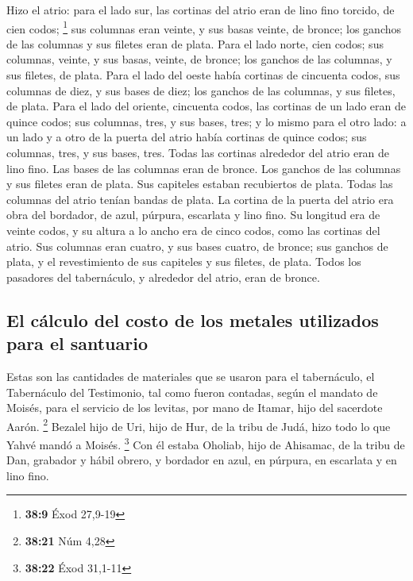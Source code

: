 \begin{paracol}{2}
 Hizo el atrio: para el lado sur, las cortinas del atrio
eran de lino fino torcido, de cien codos; \footnote{\textbf{38:9} Éxod
  27,9-19}  sus columnas eran veinte, y sus basas veinte,
de bronce; los ganchos de las columnas y sus filetes eran de plata.
 Para el lado norte, cien codos; sus columnas, veinte, y
sus basas, veinte, de bronce; los ganchos de las columnas, y sus
filetes, de plata.  Para el lado del oeste había cortinas
de cincuenta codos, sus columnas de diez, y sus bases de diez; los
ganchos de las columnas, y sus filetes, de plata.  Para
el lado del oriente, cincuenta codos,  las cortinas de un
lado eran de quince codos; sus columnas, tres, y sus bases, tres;
 y lo mismo para el otro lado: a un lado y a otro de la
puerta del atrio había cortinas de quince codos; sus columnas, tres, y
sus bases, tres.  Todas las cortinas alrededor del atrio
eran de lino fino.  Las bases de las columnas eran de
bronce. Los ganchos de las columnas y sus filetes eran de plata. Sus
capiteles estaban recubiertos de plata. Todas las columnas del atrio
tenían bandas de plata.  La cortina de la puerta del
atrio era obra del bordador, de azul, púrpura, escarlata y lino fino. Su
longitud era de veinte codos, y su altura a lo ancho era de cinco codos,
como las cortinas del atrio.  Sus columnas eran cuatro, y
sus bases cuatro, de bronce; sus ganchos de plata, y el revestimiento de
sus capiteles y sus filetes, de plata.  Todos los
pasadores del tabernáculo, y alrededor del atrio, eran de bronce.

\hypertarget{el-cuxe1lculo-del-costo-de-los-metales-utilizados-para-el-santuario}{%
\subsection{El cálculo del costo de los metales utilizados para el
santuario}\label{el-cuxe1lculo-del-costo-de-los-metales-utilizados-para-el-santuario}}

 Estas son las cantidades de materiales que se usaron
para el tabernáculo, el Tabernáculo del Testimonio, tal como fueron
contadas, según el mandato de Moisés, para el servicio de los levitas,
por mano de Itamar, hijo del sacerdote Aarón. \footnote{\textbf{38:21}
  Núm 4,28}  Bezalel hijo de Uri, hijo de Hur, de la
tribu de Judá, hizo todo lo que Yahvé mandó a Moisés. \footnote{\textbf{38:22}
  Éxod 31,1-11}  Con él estaba Oholiab, hijo de Ahisamac,
de la tribu de Dan, grabador y hábil obrero, y bordador en azul, en
púrpura, en escarlata y en lino fino.


\end{paracol}

